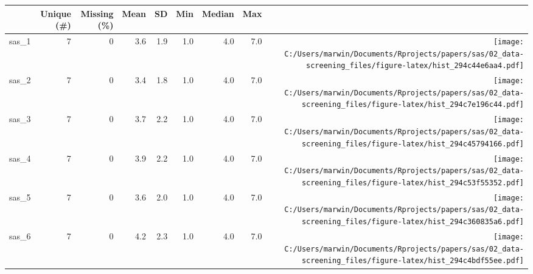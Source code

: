 \documentclass[
  letterpaper,
  DIV=11,
  numbers=noendperiod]{scrreprt}
\begin{document}
\begin{table}
\centering
\begin{tabular}[t]{lrrrrrrr>{}r}
\toprule
  & Unique (\#) & Missing (\%) & Mean & SD & Min & Median & Max &   \\
\midrule
sas\_1 & 7 & 0 & \num{3.6} & \num{1.9} & \num{1.0} & \num{4.0} & \num{7.0} & \texttt{[image: C:/Users/marwin/Documents/Rprojects/papers/sas/02\_data-screening\_files/figure-latex/hist\_294c44e6aa4.pdf]}\\
sas\_2 & 7 & 0 & \num{3.4} & \num{1.8} & \num{1.0} & \num{4.0} & \num{7.0} & \texttt{[image: C:/Users/marwin/Documents/Rprojects/papers/sas/02\_data-screening\_files/figure-latex/hist\_294c7e196c44.pdf]}\\
sas\_3 & 7 & 0 & \num{3.7} & \num{2.2} & \num{1.0} & \num{4.0} & \num{7.0} & \texttt{[image: C:/Users/marwin/Documents/Rprojects/papers/sas/02\_data-screening\_files/figure-latex/hist\_294c45794166.pdf]}\\
sas\_4 & 7 & 0 & \num{3.9} & \num{2.2} & \num{1.0} & \num{4.0} & \num{7.0} & \texttt{[image: C:/Users/marwin/Documents/Rprojects/papers/sas/02\_data-screening\_files/figure-latex/hist\_294c53f55352.pdf]}\\
sas\_5 & 7 & 0 & \num{3.6} & \num{2.0} & \num{1.0} & \num{4.0} & \num{7.0} & \texttt{[image: C:/Users/marwin/Documents/Rprojects/papers/sas/02\_data-screening\_files/figure-latex/hist\_294c360835a6.pdf]}\\
sas\_6 & 7 & 0 & \num{4.2} & \num{2.3} & \num{1.0} & \num{4.0} & \num{7.0} & \texttt{[image: C:/Users/marwin/Documents/Rprojects/papers/sas/02\_data-screening\_files/figure-latex/hist\_294c4bdf55ee.pdf]}\\
\bottomrule
\end{tabular}
\end{table}
\end{document}
